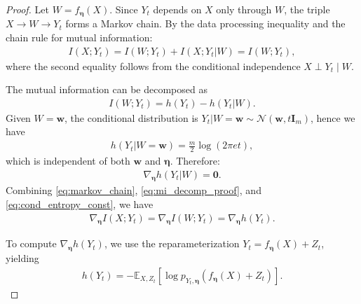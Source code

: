 \documentclass[conference]{IEEEtran}
\newcommand{\E}{\mathbb{E}}
\newcommand{\bI}{\bm{I}}
\newcommand{\Yt}{Y_t}
\begin{document}
\begin{proof}
Let $W = f_{\bm \eta}(X)$. Since $\Yt$ depends on $X$ only through $W$, the triple $X \to W \to \Yt$ forms a Markov chain. By the data processing inequality and the chain rule for mutual information:
\begin{align}
I(X; \Yt) = I(W; \Yt) + I(X; \Yt|W) = I(W; \Yt),
\label{eq:markov_chain}
\end{align}
where the second equality follows from the conditional independence $X \perp \Yt \mid W$.

The mutual information can be decomposed as
\begin{align}
I(W; \Yt) = h(\Yt) - h(\Yt|W).
\label{eq:mi_decomp_proof}
\end{align}
Given $W = \bm w$, the conditional distribution is $\Yt|W=\bm w \sim \mathcal{N}(\bm w, t\bI_m)$, 
hence we have
\begin{align}
h(\Yt|W=\bm{w}) = \frac{m}{2}\log(2\pi e t),
\end{align}
which is independent of both $\bm w$ and $\bm \eta$. Therefore:
\begin{align}
\nabla_{\bm \eta} h(\Yt|W) = \bm{0}.
\label{eq:cond_entropy_const}
\end{align}
Combining \eqref{eq:markov_chain}, \eqref{eq:mi_decomp_proof}, and \eqref{eq:cond_entropy_const},
we have
\begin{align}
\nabla_{\bm \eta} I(X; \Yt) = \nabla_{\bm \eta} I(W; \Yt) = \nabla_{\bm \eta} h(\Yt).
\label{eq:grad_mi_equals_grad_h}
\end{align}

To compute $\nabla_{\bm \eta} h(\Yt)$, we use the reparameterization $\Yt = f_{\bm \eta}(X) + Z_t$,
yielding 
\begin{align}
h(\Yt) = -\E_{X,Z_t}\left[\log p_{\Yt,\bm \eta}(f_{\bm \eta}(X) + Z_t)\right].
\end{align}


\end{proof}
\end{document}
